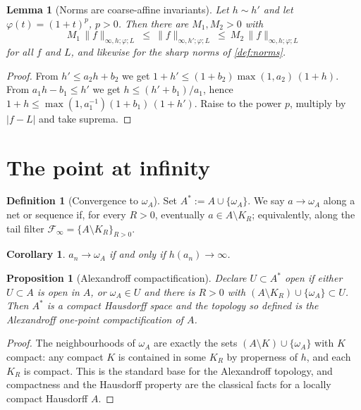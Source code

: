 \documentclass[11pt,a4paper]{article}
\numberwithin{equation}{section}
\theoremstyle{plain}
\newtheorem{proposition}[theorem]{Proposition}
\newtheorem{lemma}[theorem]{Lemma}
\newtheorem{corollary}[theorem]{Corollary}
\theoremstyle{definition}
\newtheorem{definition}[theorem]{Definition}
\theoremstyle{remark}
\newcommand{\wA}{\omega_A}
\newcommand{\Astar}{A^{\ast}}
\begin{document}
\begin{lemma}[Norms are coarse-affine invariants]\label{lem:equiv-affine}
Let $h\sim h'$ and let $\varphi(t)=(1+t)^{p}$, $p>0$. Then there are $M_1,M_2>0$ with
\[
M_1\,\|f\|_{\infty,h;\varphi;L}\ \le\ \|f\|_{\infty,h';\varphi;L}\ \le\ M_2\,\|f\|_{\infty,h;\varphi;L}
\]
for all $f$ and $L$, and likewise for the sharp norms of \cref{def:norms}.
\end{lemma}

\begin{proof}
From $h'\le a_2h+b_2$ we get $1+h'\le (1+b_2)\max(1,a_2)\,(1+h)$. From $a_1h-b_1\le h'$ we
get $h\le (h'+b_1)/a_1$, hence $1+h\le \max(1,a_1^{-1})(1+b_1)\,(1+h')$. Raise to the power
$p$, multiply by $|f-L|$ and take suprema.
\end{proof}

\section{The point at infinity}
\label{sec:infinity}

\begin{definition}[Convergence to $\wA$]\label{def:conv-infty}
Set $\Astar:=A\cup\{\wA\}$. We say $a\to\wA$ along a net or sequence if, for every $R>0$,
eventually $a\in A\setminus K_R$; equivalently, along the tail filter
$\mathcal{F}_\infty=\{A\setminus K_R\}_{R>0}$.
\end{definition}

\begin{corollary}\label{cor:conv-equiv}
$a_n\to\wA$ if and only if $h(a_n)\to\infty$.
\end{corollary}

\begin{proposition}[Alexandroff compactification]\label{prop:alexandroff}
Declare $U\subset\Astar$ open if either $U\subset A$ is open in $A$, or $\wA\in U$ and
there is $R>0$ with $(A\setminus K_R)\cup\{\wA\}\subset U$. Then $\Astar$ is a compact
Hausdorff space and the topology so defined is the Alexandroff one-point compactification
of $A$.
\end{proposition}

\begin{proof}
The neighbourhoods of $\wA$ are exactly the sets $(A\setminus K)\cup\{\wA\}$ with $K$
compact: any compact $K$ is contained in some $K_R$ by properness of $h$, and each $K_R$
is compact. This is the standard base for the Alexandroff topology, and compactness and
the Hausdorff property are the classical facts for a locally compact Hausdorff $A$.
\end{proof}
\end{document}
